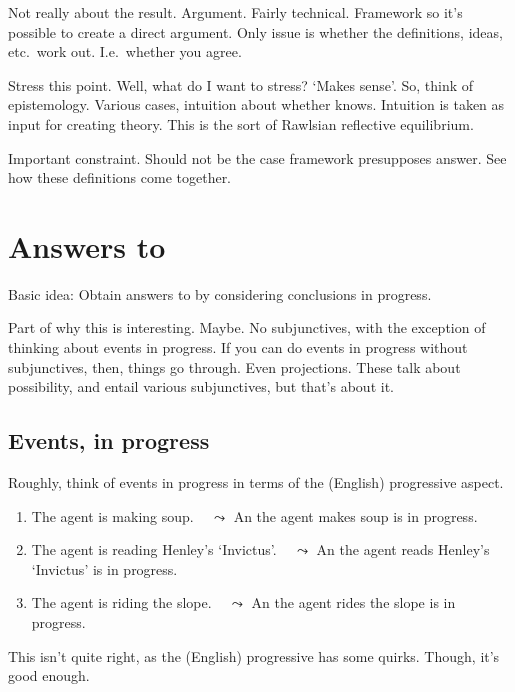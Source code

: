 \documentclass[10pt]{article}
\begin{document}
\begin{note}
  Not really about the result.
  Argument.
  Fairly technical.
  Framework so it's possible to create a direct argument.
  Only issue is whether the definitions, ideas, etc.\ work out.
  I.e.\ whether you agree.

  Stress this point.
  Well, what do I want to stress?
  `Makes sense'.
  So, think of epistemology.
  Various cases, intuition about whether knows.
  Intuition is taken as input for creating theory.
  This is the sort of Rawlsian reflective equilibrium.

  Important constraint.
  Should not be the case framework presupposes answer.
  See how these definitions come together.
  
\end{note}

\newpage

\section{Answers to \qWhy{}}
\label{sec:answers-qwhy}

\begin{note}
  Basic idea: Obtain answers to \qWhy{} by considering conclusions in progress.
\end{note}


\begin{note}
  Part of why this is interesting.
  Maybe.
  No subjunctives, with the exception of thinking about events in progress.
  If you can do events in progress without subjunctives, then, things go through.
  Even projections.
  These talk about possibility, and entail various subjunctives, but that's about it.
\end{note}


\subsection{Events, in progress}
\label{sec:events-progress}

\begin{note}
  Roughly, think of events in progress in terms of the (English) progressive aspect.
  \begin{enumerate}
  \item
    The agent is making soup.\newline
    \mbox{ } \hfill \(\leadsto\) An  the agent makes soup is in progress.
  \item
    The agent is reading Henley's `Invictus'.\newline
    \mbox{ } \hfill \(\leadsto\) An  the agent reads Henley's `Invictus' is in progress.
  \item
    The agent is riding the slope.\newline
    \mbox{ } \hfill \(\leadsto\) An  the agent rides the slope is in progress.
  \end{enumerate}
  This isn't quite right, as the (English) progressive has some quirks.
  Though, it's good enough.
\end{note}
\end{document}
